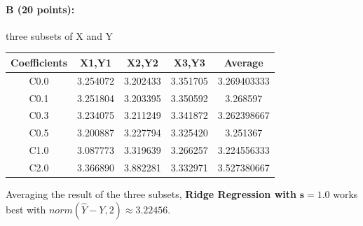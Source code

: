 \documentclass[11pt]{article}
\begin{document}
\paragraph{B (20 points):} three subsets of X and Y
\begin{table}[H]
\centering
\begin{tabular}{c|c|c|c|c}
Coefficients & X1,Y1 & X2,Y2 & X3,Y3 & Average\\
\hline
C0.0 & 3.254072 & 3.202433 & 3.351705 & 3.269403333 \\
C0.1 & 3.251804 & 3.203395 & 3.350592 & 3.268597 \\
C0.3 & 3.234075 & 3.211249 & 3.341872 & 3.262398667 \\
C0.5 & 3.200887 & 3.227794 & 3.325420 & 3.251367 \\
C1.0 & 3.087773 & 3.319639 & 3.266257 & 3.224556333 \\
C2.0 & 3.366890 & 3.882281 & 3.332971 & 3.527380667 \\
\end{tabular}
\end{table}
Averaging the result of the three subsets, \textbf{Ridge Regression with} $\mathbf{s=1.0}$ works best with $norm(\hat{Y}-Y,2)\approx3.22456$.

\newpage
\end{document}
